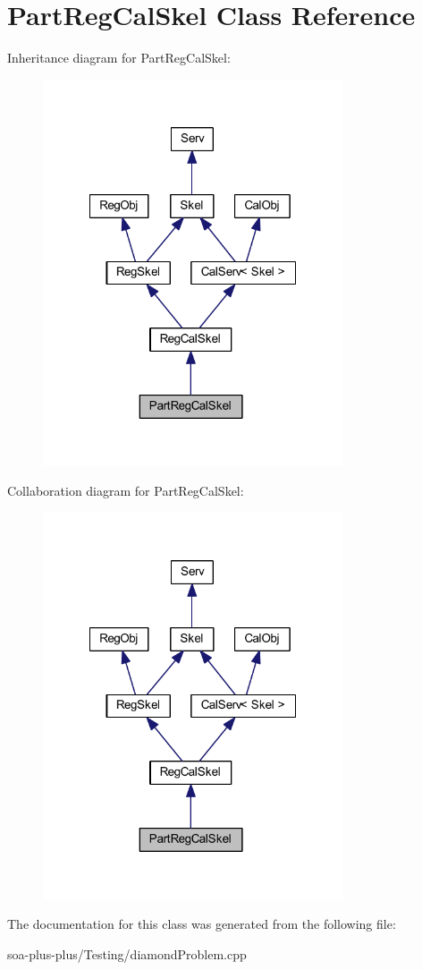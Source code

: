 \hypertarget{class_part_reg_cal_skel}{
\section{PartRegCalSkel Class Reference}
\label{class_part_reg_cal_skel}
}


Inheritance diagram for PartRegCalSkel:\nopagebreak
\begin{figure}[H]
\begin{center}
\leavevmode
\includegraphics[width=251pt]{class_part_reg_cal_skel__inherit__graph}
\end{center}
\end{figure}


Collaboration diagram for PartRegCalSkel:\nopagebreak
\begin{figure}[H]
\begin{center}
\leavevmode
\includegraphics[width=251pt]{class_part_reg_cal_skel__coll__graph}
\end{center}
\end{figure}


The documentation for this class was generated from the following file:\begin{DoxyCompactItemize}
\item 
soa-\/plus-\/plus/Testing/diamondProblem.cpp\end{DoxyCompactItemize}
